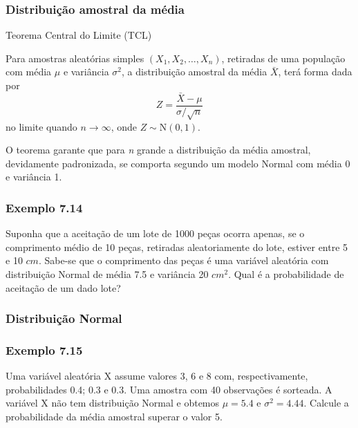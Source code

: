 \documentclass[11pt]{beamer}
\begin{document}
\begin{frame}
\frametitle{Distribuição amostral da média}

\begin{block}{Teorema Central do Limite (TCL)}

Para amostras aleatórias simples \((X_1, X_2, \ldots, X_n)\), retiradas
de uma população com média \(\mu\) e variância \(\sigma^2\), a
distribuição amostral da média \(\bar{X}\), terá forma dada por \[
Z = \frac{\bar{X} - \mu}{\sigma/\sqrt{n}}
\] no limite quando \(n \to \infty\), onde \(Z \sim \text{N}(0,1)\).

\end{block}

O teorema garante que para \textit{n} grande a distribuição da média amostral, devidamente padronizada, se comporta segundo um modelo Normal com média 0 e variância 1.

\end{frame}

\begin{frame}
\frametitle{Exemplo 7.14}
Suponha que a aceitação de um lote de 1000 peças ocorra apenas, se o comprimento médio de 10 peças, retiradas aleatoriamente do lote, estiver entre 5 e 10 \(cm\). Sabe-se que o comprimento das peças é uma variável aleatória com distribuição Normal de média 7.5 e variância 20 \(cm^2\). Qual é a probabilidade de aceitação de um dado lote?
\vspace{1in}
\vspace{1in}

\end{frame}

\begin{frame}
\frametitle{Distribuição Normal}

\end{frame}


\begin{frame}
\frametitle{Exemplo 7.15}
Uma variável aleatória X assume valores 3, 6 e 8 com, respectivamente, probabilidades 0.4; 0.3 e 0.3. Uma amostra com 40 observações é sorteada. A variável X não tem distribuição Normal e obtemos \(\mu=5.4\) e \(\sigma^2=4.44\). Calcule a probabilidade da média amostral superar o valor 5.
\vspace{1in}
\vspace{1in}

\end{frame}
\end{document}
